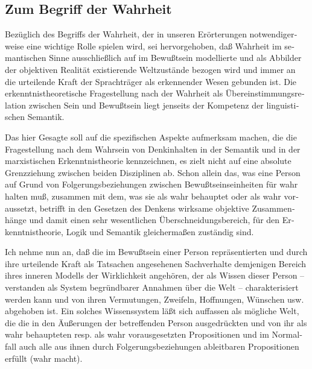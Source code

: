 \documentclass[output=paper]{langscibook}
\begin{document}
\begin{otherlanguage}{german}
\subsection{Zum Begriff der Wahrheit}\label{sec:zi83:3.2}

Bezüglich des Begriffs der Wahrheit, der in unseren Erörterungen notwendigerweise eine wichtige Rolle spielen wird, sei hervorgehoben, daß Wahrheit im semantischen Sinne ausschließlich auf im Bewußtsein modellierte und als Abbilder der objektiven Realität existierende Weltzustände bezogen wird und immer an die urteilende Kraft der Sprachträger als erkennender Wesen gebunden ist. Die erkenntnistheoretische Fragestellung nach der Wahrheit als Übereinstimmungsrelation zwischen Sein und Bewußtsein liegt jenseits der Kompetenz der linguistischen Semantik.

Das hier Gesagte soll auf die spezifischen Aspekte aufmerksam machen, die die Fragestellung nach dem Wahrsein von Denkinhalten in der Semantik und in der marxistischen Erkenntnistheorie kennzeichnen, es zielt nicht auf eine absolute Grenzziehung zwischen beiden Disziplinen ab. Schon allein das, was eine Person auf Grund von Folgerungsbeziehungen zwischen Bewußtseinseinheiten für wahr halten muß, zusammen mit dem, was sie als wahr behauptet oder als wahr voraussetzt, betrifft in den Gesetzen des Denkens wirksame objektive Zusammenhänge und damit einen sehr wesentlichen Überschneidungsbereich, für den Erkenntnistheorie, Logik und Semantik gleichermaßen zuständig sind.

Ich nehme nun an, daß die im Bewußtsein einer Person repräsentierten und durch ihre urteilende Kraft als Tatsachen angesehenen Sachverhalte demjenigen Bereich ihres inneren Modells der Wirklichkeit angehören, der als Wissen dieser Person -- verstanden als System begründbarer Annahmen über die Welt -- charakterisiert werden kann und von ihren Vermutungen, Zweifeln, Hoffnungen, Wünschen usw. abgehoben ist. Ein solches Wissenssystem läßt sich auffassen als mögliche Welt, die die in den Äußerungen der betreffenden Person ausgedrückten und von ihr als wahr behaupteten resp. als wahr vorausgesetzten Propositionen und im Normalfall auch alle aus ihnen durch Folgerungsbeziehungen ableitbaren Propositionen erfüllt (wahr macht).


\end{otherlanguage}
\end{document}
